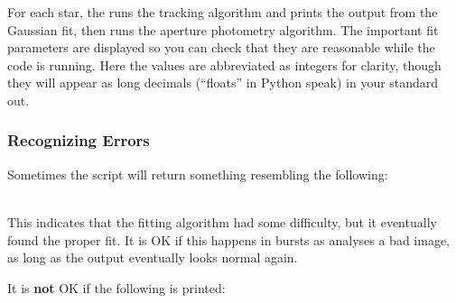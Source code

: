 \documentclass{article}
\begin{document}
For each star, the \oscaar  runs the tracking algorithm and prints the output from the Gaussian fit, then runs the aperture photometry algorithm. The important fit parameters are displayed so you can check that they are reasonable while the code is running. Here the values are abbreviated as integers for clarity, though they will appear as long decimals (``floats'' in Python speak) in your standard out. 

\subsubsection{Recognizing Errors}
\label{sec:err}
Sometimes the script will return something resembling the following: \\

{\addtolength{\leftskip}{10 mm}
{\scriptsize
\noindent {}\\

	}
}

\noindent This indicates that the fitting algorithm had some difficulty, but it eventually found the proper fit. It is OK if this happens in bursts as \oscaar  analyses a bad image, as long as the output eventually looks normal again. 

It is \textbf{not} OK if the following is printed: \\

{\addtolength{\leftskip}{10 mm}
{\scriptsize
\noindent {}\\

	}
}
\end{document}
